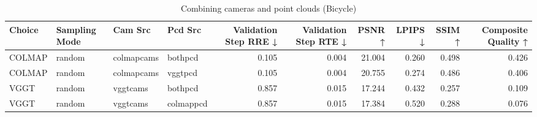 \begin{table}[H]
\caption{Combining cameras and point clouds (Bicycle)}
\label{tab:99_combined_bicycle}
\begin{tabular}{llllrrrrrr}
\toprule
Choice & Sampling Mode & Cam Src & Pcd Src & Validation Step RRE ↓ & Validation Step RTE ↓ & PSNR ↑ & LPIPS ↓ & SSIM ↑ & Composite Quality ↑ \\
\midrule
COLMAP & random & colmapcams & bothpcd & 0.105 & 0.004 & 21.004 & 0.260 & 0.498 & 0.426 \\
COLMAP & random & colmapcams & vggtpcd & 0.105 & 0.004 & 20.755 & 0.274 & 0.486 & 0.406 \\
VGGT & random & vggtcams & bothpcd & 0.857 & 0.015 & 17.244 & 0.432 & 0.257 & 0.109 \\
VGGT & random & vggtcams & colmappcd & 0.857 & 0.015 & 17.384 & 0.520 & 0.288 & 0.076 \\
\bottomrule
\end{tabular}
\end{table}
